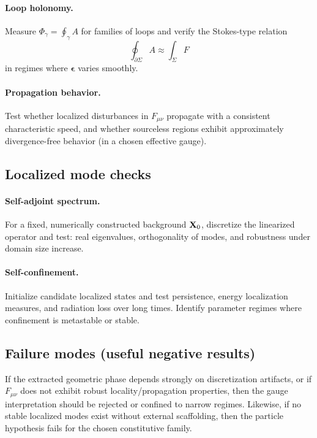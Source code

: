 \paragraph{Loop holonomy.}
Measure $\Phi_\gamma=\oint_\gamma A$ for families of loops and verify the Stokes-type relation
\begin{equation}
  \oint_{\partial\Sigma} A \approx \int_\Sigma F
\end{equation}
in regimes where $\bm{\epsilon}$ varies smoothly.

\paragraph{Propagation behavior.}
Test whether localized disturbances in $F_{\mu\nu}$ propagate with a consistent characteristic speed,
and whether sourceless regions exhibit approximately divergence-free behavior (in a chosen effective gauge).

\subsection{Localized mode checks}

\paragraph{Self-adjoint spectrum.}
For a fixed, numerically constructed background $\mathbf{X}_0$, discretize the linearized operator and test:
real eigenvalues, orthogonality of modes, and robustness under domain size increase.

\paragraph{Self-confinement.}
Initialize candidate localized states and test persistence, energy localization measures, and
radiation loss over long times. Identify parameter regimes where confinement is metastable or stable.

\subsection{Failure modes (useful negative results)}

If the extracted geometric phase depends strongly on discretization artifacts,
or if $F_{\mu\nu}$ does not exhibit robust locality/propagation properties,
then the gauge interpretation should be rejected or confined to narrow regimes.
Likewise, if no stable localized modes exist without external scaffolding,
then the particle hypothesis fails for the chosen constitutive family.
